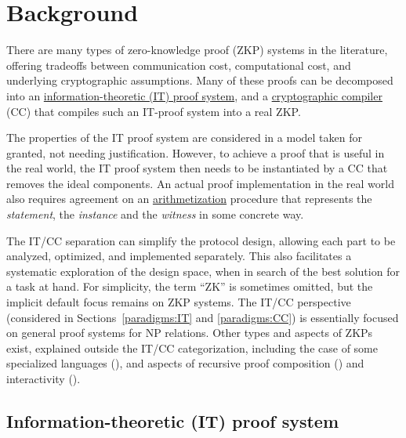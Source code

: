 \section{Background}
\label{paradigms:background}

There are many types of zero-knowledge proof (ZKP) systems in the literature, offering tradeoffs between communication cost, computational cost, and underlying cryptographic assumptions. 
Many of these proofs can be decomposed into an 
\hyperref[par:paradigms:background:IT]{information-theoretic (IT) proof system}, and a 
\hyperref[par:paradigms:background:CC]{cryptographic compiler} (CC) that compiles such an IT-proof system into a real ZKP.

The properties of the IT proof system are considered in a model taken for granted, not needing justification.
However, to achieve a proof that is useful in the real world, the IT proof system then needs to be instantiated by a CC that removes the ideal components.
An actual proof implementation in the real world also requires agreement on an  \hyperref[par:paradigms:background:arithmetization]{arithmetization} procedure that 
represents the \emph{statement}, the \emph{instance} and the \emph{witness} in some concrete way.


The IT/CC separation can simplify the protocol design, allowing each part to be analyzed, optimized, and implemented separately.
This also facilitates a systematic exploration of the design space, when in search of the best solution for a task at hand.
For simplicity, the term ``ZK'' is sometimes omitted, but the implicit default focus remains on ZKP systems. 
The IT/CC perspective (considered in Sections~\ref{paradigms:IT} and \ref{paradigms:CC}) is essentially focused on general proof systems for NP relations.
Other types and aspects of ZKPs exist, explained outside the IT/CC categorization, including the case of some specialized languages (), and aspects of recursive proof composition () and interactivity ().
\loosen



\subsection{Information-theoretic (IT) proof system}
\label{par:paradigms:background:IT}


